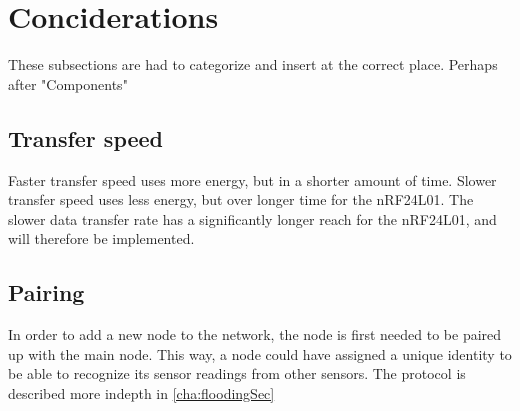 \section{Conciderations}
These subsections are had to categorize and insert at the correct place. Perhaps after "Components"

\subsection{Transfer speed}
Faster transfer speed uses more energy, but in a shorter amount of time. Slower transfer speed uses less energy, but over longer time for the nRF24L01. The slower data transfer rate has a significantly longer reach for the nRF24L01, and will therefore be implemented. 

\subsection{Pairing}
In order to add a new node to the network, the node is first needed to be paired up with the main node.
This way, a node could have assigned a unique identity to be able to recognize its sensor readings from other sensors. 
The protocol is described more indepth in \ref{cha:floodingSec}

